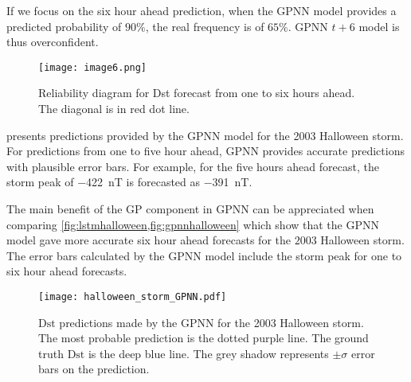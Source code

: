 If we focus on the six hour ahead prediction, when the GPNN model provides a predicted probability of $90\%$, the 
real frequency is of $65\%$. GPNN $t+6$ model is thus overconfident. 



\begin{figure}
	\texttt{[image: image6.png]}
	\caption{Reliability diagram for Dst forecast from one to six hours ahead. The diagonal is in red dot line.}
	\label{fig:gpnnreliability}
\end{figure}




 presents predictions provided by the GPNN model for the 2003 Halloween storm. 
For predictions from one to five hour ahead, GPNN provides accurate predictions with plausible error bars. 
For example, for the five hours ahead forecast, the storm peak of \SI{-422}{\nano\tesla} is forecasted as 
\SI{-391}{\nano\tesla}. 

The main benefit of the GP component in GPNN can be appreciated when comparing 
\cref{fig:lstmhalloween,fig:gpnnhalloween} which show that the GPNN model gave more accurate six 
hour ahead forecasts for the $2003$ Halloween storm. The error bars calculated by the GPNN model 
include the storm peak for one to six hour ahead forecasts.

\begin{figure}
	\texttt{[image: halloween\_storm\_GPNN.pdf]}
	\caption{$\mathrm{Dst}$ predictions made by the GPNN for the 2003 Halloween storm. 
	The most probable prediction is the dotted purple line. 
	The ground truth $\mathrm{Dst}$ is the deep blue line. 
	The grey shadow represents $\pm\sigma$ error bars on the prediction.}
    \label{fig:gpnnhalloween}
\end{figure}



